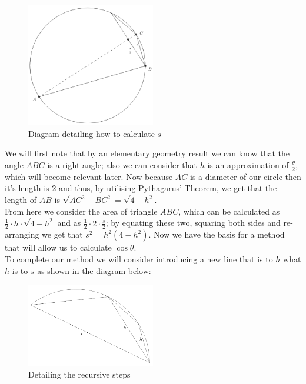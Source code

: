 \begin{figure}[!ht]
	\label{FIG_"Geometric Trig 2"}
	\caption{Diagram detailing how to calculate \(s\)}
	\centering
	\includegraphics[width=0.5\textwidth]{"./Diagrams/Geometric Trig Diagram 2"}
\end{figure}

We will first note that by an elementary geometry result we can know that the angle \(ABC\) is a right-angle; also we can consider that \(h\) is an approximation of \(\tfrac{\theta}{2}\), which will become relevant later. Now because \(AC\) is a diameter of our circle then it's length is 2 and thus, by utilising Pythagarus' Theorem, we get that the length of \(AB\) is \(\sqrt{AC^2 - BC^2} = \sqrt{4 - h^2}\).\\

From here we consider the area of triangle \(ABC\), which can be calculated as \(\frac{1}{2}\cdot h\cdot\sqrt{4-h^2}\) and as \(\frac{1}{2}\cdot2\cdot\frac{s}{2}\); by equating these two, squaring both sides and re-arranging we get that \(s^2 = h^2(4 - h^2)\). Now we have the basis for a method that will allow us to calculate \(\cos\theta\).\\

To complete our method we will consider introducing a new line that is to \(h\) what \(h\) is to \(s\) as shown in the diagram below:

\begin{figure}[!ht]
	\label{FIG_"Geometric Trig 3"}
	\caption{Detailing the recursive steps}
	\centering
	\includegraphics[width=0.5\textwidth]{"./Diagrams/Geometric Trig Diagram 3"}
\end{figure}

